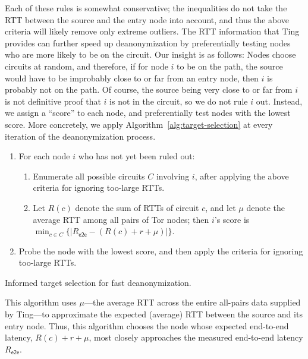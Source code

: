 Each of these rules is somewhat conservative; the inequalities do not
take the RTT between the source and the entry node into account, and
thus the above criteria will likely remove only extreme outliers.
%
The RTT information that Ting provides can further speed up
deanonymization by preferentially testing nodes who are more likely to
be on the circuit.
%
Our insight is as follows: Nodes choose circuits at random, and
therefore, if for node $i$ to be on the path, the source would have to
be improbably close to or far from an entry node, then $i$ is probably not
on the path.
%
Of course, the source being very close to or far from $i$ is not
definitive proof that $i$ is not in the circuit, so we do not rule $i$
out.
%
Instead, we assign a ``score'' to each node, and preferentially test
nodes with the lowest score.
%
More concretely, we apply Algorithm~\ref{alg:target-selection} at every
iteration of the deanonymization process.

\begin{algorithm}[t!]

\begin{enumerate}

\item For each node $i$ who has not yet been ruled out:
%
\begin{enumerate}
	\item Enumerate all possible circuits $C$ involving $i$, after
	applying the above criteria for ignoring too-large RTTs.

	\item Let $R(c)$ denote the sum of RTTs of circuit $c$, and let
	$\mu$ denote the average RTT among all pairs of Tor nodes; then
	$i$'s score is $\min_{c \in C} \{ | R_\mathsf{e2e} - (R(c) + r + \mu) |\}$.
\end{enumerate}

\item Probe the node with the lowest score, and then apply the criteria
for ignoring too-large RTTs.

\end{enumerate}

\caption{Informed target selection for fast deanonymization.}
\label{alg:target-selection}

\end{algorithm}

This algorithm uses $\mu$---the average RTT across the entire all-pairs
data supplied by Ting---to approximate the expected (average) RTT between
the source and its entry node.
%
Thus, this algorithm chooses the node whose expected end-to-end
latency, $R(c) + r + \mu$, most closely approaches the measured
end-to-end latency $R_\mathsf{e2e}$.


